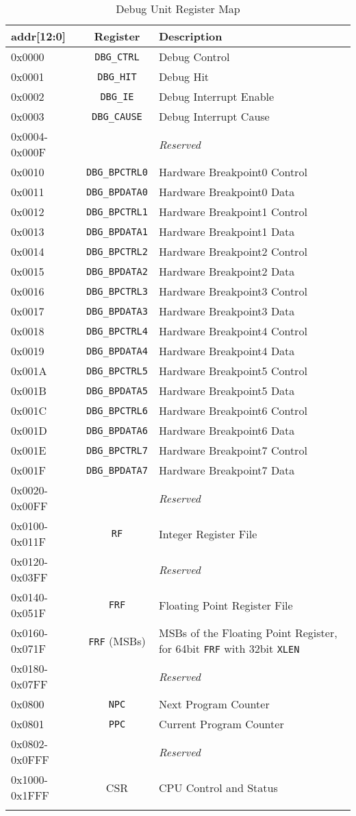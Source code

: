 \begin{longtable}[]{@{}lcp{6cm}@{}}
	\toprule
	\textbf{addr[12:0]} & \textbf{Register} & \textbf{Description}\tabularnewline
	\midrule

	\endhead

	0x0000        & \texttt{DBG\_CTRL}    & Debug Control\tabularnewline
	0x0001        & \texttt{DBG\_HIT}     & Debug Hit\tabularnewline
	0x0002        & \texttt{DBG\_IE}      & Debug Interrupt Enable\tabularnewline
	0x0003        & \texttt{DBG\_CAUSE}   & Debug Interrupt Cause\tabularnewline
	0x0004-0x000F &                       & \emph{Reserved}\tabularnewline
	0x0010        & \texttt{DBG\_BPCTRL0} & Hardware Breakpoint0 Control\tabularnewline
	0x0011        & \texttt{DBG\_BPDATA0} & Hardware Breakpoint0 Data\tabularnewline
	0x0012        & \texttt{DBG\_BPCTRL1} & Hardware Breakpoint1 Control\tabularnewline
	0x0013        & \texttt{DBG\_BPDATA1} & Hardware Breakpoint1 Data\tabularnewline
	0x0014        & \texttt{DBG\_BPCTRL2} & Hardware Breakpoint2 Control\tabularnewline
	0x0015        & \texttt{DBG\_BPDATA2} & Hardware Breakpoint2 Data\tabularnewline
	0x0016        & \texttt{DBG\_BPCTRL3} & Hardware Breakpoint3 Control\tabularnewline
	0x0017        & \texttt{DBG\_BPDATA3} & Hardware Breakpoint3 Data\tabularnewline
	0x0018        & \texttt{DBG\_BPCTRL4} & Hardware Breakpoint4 Control\tabularnewline
	0x0019        & \texttt{DBG\_BPDATA4} & Hardware Breakpoint4 Data\tabularnewline
	0x001A        & \texttt{DBG\_BPCTRL5} & Hardware Breakpoint5 Control\tabularnewline
	0x001B        & \texttt{DBG\_BPDATA5} & Hardware Breakpoint5 Data\tabularnewline
	0x001C        & \texttt{DBG\_BPCTRL6} & Hardware Breakpoint6 Control\tabularnewline
	0x001D        & \texttt{DBG\_BPDATA6} & Hardware Breakpoint6 Data\tabularnewline
	0x001E        & \texttt{DBG\_BPCTRL7} & Hardware Breakpoint7 Control\tabularnewline
	0x001F        & \texttt{DBG\_BPDATA7} & Hardware Breakpoint7 Data\tabularnewline
	0x0020-0x00FF &                       & \emph{Reserved}\tabularnewline
	0x0100-0x011F & \texttt{RF}           & Integer Register File\tabularnewline
	0x0120-0x03FF &                       & \emph{Reserved}\tabularnewline
	0x0140-0x051F & \texttt{FRF}          & Floating Point Register File\tabularnewline
	0x0160-0x071F & \texttt{FRF} (MSBs)   & MSBs of the Floating Point Register, for
	64bit \texttt{FRF} with 32bit \texttt{XLEN}\tabularnewline
	0x0180-0x07FF &                       & \emph{Reserved}\tabularnewline
	0x0800        & \texttt{NPC}          & Next Program Counter\tabularnewline
	0x0801        & \texttt{PPC}          & Current Program Counter\tabularnewline
	0x0802-0x0FFF &                       & \emph{Reserved}\tabularnewline
	0x1000-0x1FFF & CSR                   & CPU Control and Status\tabularnewline
	\bottomrule
	\caption{Debug Unit Register Map}
	\label{tab:debug-reg-map}
\end{longtable}

